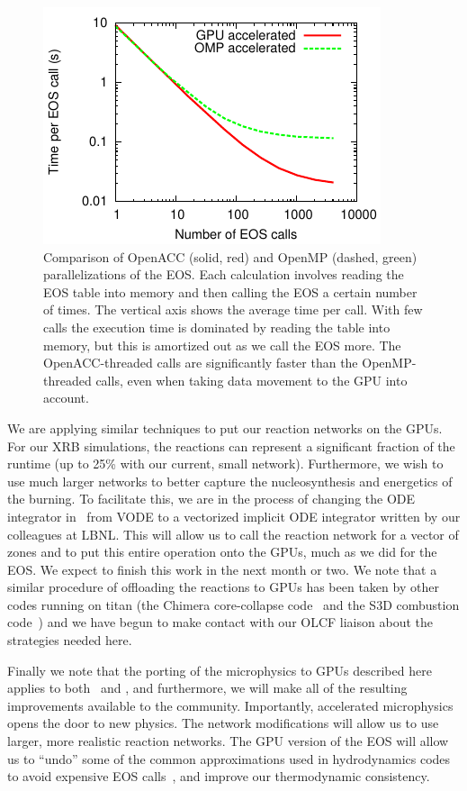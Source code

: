 \begin{figure}[t]
  \centering
  \includegraphics[width=0.5\linewidth]{eos_openacc.pdf}
  \begin{minipage}[b]{0.45\linewidth}
  \caption{Comparison of OpenACC (solid, red) and OpenMP (dashed,
    green) parallelizations of the EOS. Each calculation involves
    reading the EOS table into memory and then calling the EOS a
    certain number of times. The vertical axis shows the average time
    per call.  With few calls the execution time is dominated by
    reading the table into memory, but this is amortized out as we
    call the EOS more.  The OpenACC-threaded calls are significantly faster
    than the OpenMP-threaded calls, even when taking data movement to
    the GPU into account.\label{fig-eos-openacc}}
   \end{minipage}
\end{figure}

We are applying similar techniques to put our reaction networks on the
GPUs.  For our XRB simulations, the reactions can represent a
significant fraction of the runtime (up to 25\% with our current,
small network).  Furthermore, we wish to use much larger networks to
better capture the nucleosynthesis and energetics of the burning.  To
facilitate this, we are in the process of changing the ODE integrator
in \maestro\ from VODE to a vectorized implicit ODE integrator written
by our colleagues at LBNL.  This will allow us to call the reaction
network for a vector of zones and to put this entire operation onto
the GPUs, much as we did for the EOS.  We expect to finish this work
in the next month or two.  We note that a similar procedure of
offloading the reactions to GPUs has been taken by other codes running
on titan (the Chimera core-collapse code~\cite{chimera-gpu} and the
S3D combustion code~\cite{s3d}) and we have begun to make contact with
our OLCF liaison about the strategies needed here.

Finally we note that the porting of the microphysics to GPUs described
here applies to both \maestro\ and \castro, and furthermore, we will
make all of the resulting improvements available to the community.
Importantly, accelerated microphysics opens the door to new physics.
The network modifications will allow us to use larger, more realistic
reaction networks.  The GPU version of the EOS will allow us to 
``undo'' some of the common approximations used in hydrodynamics 
codes to avoid expensive EOS calls~\cite{colellaglaz:1985}, and improve our thermodynamic
consistency.

